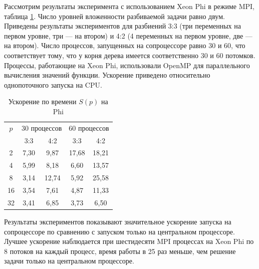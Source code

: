 \par
Рассмотрим результаты эксперимента с использованием Xeon Phi в режиме MPI, таблица \ref{table:time_speedUp_phi_2}. Число уровней вложенности разбиваемой задачи равно двум. Приведены результаты экспериментов для разбиений 3:3 (три переменных на первом уровне, три –-- на втором) и 4:2 (4 переменных на первом уровне, две –-- на втором). Число процессов, запущенных на сопроцессоре равно 30 и 60, что соответствует тому, что у корня дерева имеется соответственно 30 и 60 потомков. Процессы, работающие на Xeon Phi, использовали OpenMP для параллельного вычисления значений функции. Ускорение приведено относительно однопоточного запуска на CPU.
\begin{table}
    \centering
    \begin{tabular}{|c|c|c|c|c|}
    \hline
    \(p\) & \multicolumn{2}{|c|}{30 процессов} & \multicolumn{2}{|c|}{60 процессов}\\ \cline{2-5}
	& 3:3 & 4:2 & 3:3 & 4:2 \\ \hline
	2 & 7,30 & 9,87 & 17,68 & 18,21 \\ \hline
	4 & 5,99 & 8,18 & 6,60 & 13,57 \\ \hline
	8 & 3,14 & 12,74 & 5,92 & 25,58 \\ \hline
	16 & 3,54 & 7,61 & 4,87 & 11,33 \\ \hline
	32 & 3,41 & 6,85 & 3,73 & 6,50 \\ \hline
\end{tabular}
    \caption{Ускорение по времени \(S(p)\) на Phi}
    \label{table:time_speedUp_phi_2}
\end{table}
\par
Результаты экспериментов показывают значительное ускорение запуска на сопроцессоре по сравнению с запуском только на центральном процессоре. Лучшее ускорение наблюдается при шестидесяти MPI процессах на Xeon Phi по 8 потоков на каждый процесс, время работы в 25 раз меньше, чем решение задачи только на центральном процессоре.
